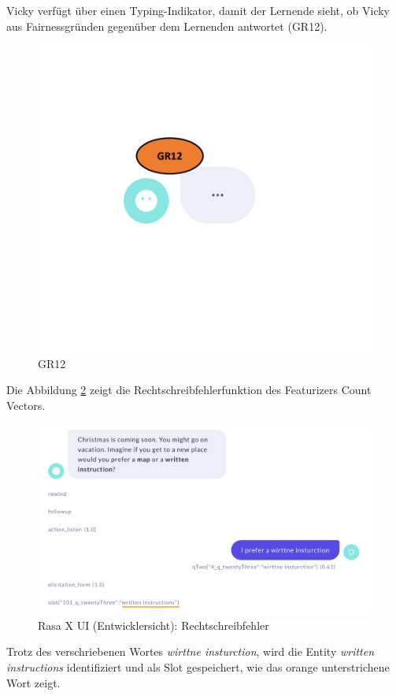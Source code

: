 Vicky verfügt über einen Typing-Indikator, damit 
der Lernende sieht, ob Vicky aus Fairnessgründen gegenüber 
dem Lernenden antwortet (GR12).
\begin{figure}[H]
  \centering
  \includegraphics[width=0.35\linewidth]{images/typing.png}
  \caption[GR12]{GR12}
  \label{fig:Typing-Indikator}
\end{figure} 

Die Abbildung \ref{fig:Rechtschreibfehler} zeigt die Rechtschreibfehlerfunktion des Featurizers Count Vectors.
\begin{figure}[H]
  \centering
  \includegraphics[width=0.8\linewidth]{images/Rechtschreibfehler.png}
  \caption[Rasa X UI (Entwicklersicht): Rechtschreibfehler]{Rasa X UI (Entwicklersicht): Rechtschreibfehler}
  \label{fig:Rechtschreibfehler}
\end{figure} 
Trotz des verschriebenen Wortes \textit{wirttne insturction}, wird die Entity
 \textit{written instructions} identifiziert und als Slot gespeichert, wie 
das orange unterstrichene Wort zeigt. 


